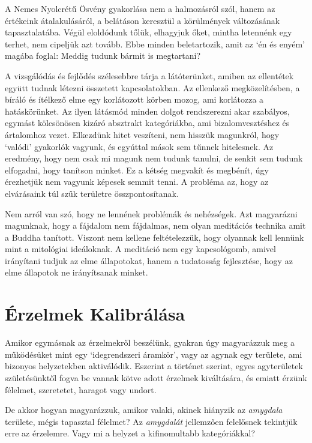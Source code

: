 A Nemes Nyolcrétű Ösvény gyakorlása nem a halmozásról szól, hanem az
értékeink átalakulásáról, a belátáson keresztül a körülmények
változásának tapasztalatába. Végül eloldódunk tőlük, elhagyjuk őket,
mintha letennénk egy terhet, nem cipeljük azt tovább. Ebbe minden
beletartozik, amit az `én és enyém' magába foglal: Meddig tudunk bármit
is megtartani?


A vizsgálódás és fejlődés szélesebbre tárja a látóterünket, amiben az
ellentétek együtt tudnak létezni összetett kapcsolatokban. Az ellenkező
megközelítésben, a bíráló és ítélkező elme egy korlátozott körben mozog,
ami korlátozza a hatáskörünket. Az ilyen látásmód minden dolgot
rendszerezni akar szabályos, egymást kölcsönösen kizáró absztrakt
kategóriákba, ami bizalomvesztéshez és ártalomhoz vezet. Elkezdünk hitet
veszíteni, nem hisszük magunkról, hogy `valódi' gyakorlók vagyunk, és
egyúttal mások sem tűnnek hitelesnek. Az eredmény, hogy nem csak mi
magunk nem tudunk tanulni, de senkit sem tudunk elfogadni, hogy tanítson
minket. Ez a kétség megvakít és megbénít, úgy érezhetjük nem vagyunk
képesek semmit tenni. A probléma az, hogy az elvárásaink túl szűk
területre összpontosítanak.

Nem arról van szó, hogy ne lennének problémák és nehézségek. Azt
magyarázni magunknak, hogy a fájdalom nem fájdalmas, nem olyan
meditációs technika amit a Buddha tanított. Viszont nem kellene
feltételezzük, hogy olyannak kell lennünk mint a mitológiai ideáloknak.
A meditáció nem egy kapcsológomb, amivel irányítani tudjuk az elme
állapotokat, hanem a tudatosság fejlesztése, hogy az elme állapotok ne
irányítsanak minket.

\section{Érzelmek Kalibrálása}


\noindent Amikor egymásnak az érzelmekről beszélünk, gyakran úgy
magyarázzuk meg a működésüket mint egy `idegrendszeri áramkör', vagy az
agynak egy területe, ami bizonyos helyzetekben aktiválódik. Eszerint a
történet szerint, egyes agyterületek születésünktől fogva be vannak
kötve adott érzelmek kiváltására, és emiatt érzünk félelmet, szeretetet,
haragot vagy undort.

De akkor hogyan magyarázzuk, amikor valaki, akinek hiányzik az
\emph{amygdala} területe, mégis tapasztal félelmet? Az \emph{amygdalát}
jellemzően felelősnek tekintjük erre az érzelemre. Vagy mi a helyzet a
kifinomultabb kategóriákkal?

